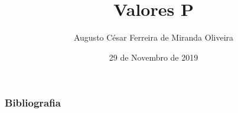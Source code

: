\documentclass[xcolor={dvipsnames},aspectratio=169,xcolor=table]{beamer}
\institute[]{Programa de Pós Graduação em Biometria e Estatística Aplicada}
\title{Valores P}
\author{Augusto César Ferreira de Miranda Oliveira}
\date{29 de Novembro de 2019}
\begin{document}
    \frame{\titlepage}
    
    \begin{frame}[c]
    \frametitle{Bibliografia}
    \printbibliography
    \end{frame}
    \frame{\titlepage}
\end{document}
